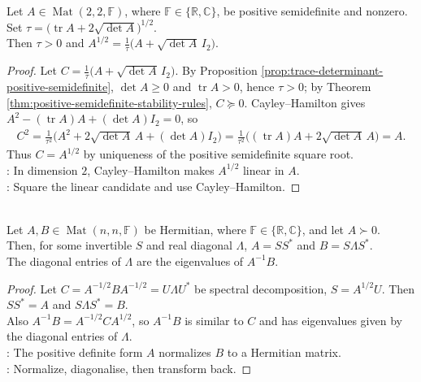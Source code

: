 \begin{proposition} \label{prop:two-by-two-positive-semidefinite-square-root} \\
Let $A\in\operatorname{Mat}(2,2,\mathbb{F})$, where $\mathbb{F}\in\{\mathbb{R},\mathbb{C}\}$, be positive semidefinite and nonzero. Set $\tau=\bigl(\operatorname{tr}A+2\sqrt{\det A}\bigr)^{1/2}$.\\
Then $\tau>0$ and $A^{1/2}=\frac{1}{\tau}\bigl(A+\sqrt{\det A}\,I_2\bigr)$.
\begin{proof}
Let $C=\frac{1}{\tau}\bigl(A+\sqrt{\det A}\,I_2\bigr)$. By Proposition \ref{prop:trace-determinant-positive-semidefinite}, $\det A\geq0$ and $\operatorname{tr}A>0$, hence $\tau>0$; by Theorem \ref{thm:positive-semidefinite-stability-rules}, $C\succeq0$. Cayley--Hamilton gives $A^2-(\operatorname{tr}A)A+(\det A)I_2=0$, so
\begin{align}
C^2 =\frac{1}{\tau^2}\bigl(A^2+2\sqrt{\det A}\,A+(\det A)I_2\bigr) =\frac{1}{\tau^2}\bigl((\operatorname{tr}A)A+2\sqrt{\det A}\,A\bigr)=A.
\nonumber
\end{align}
Thus $C=A^{1/2}$ by uniqueness of the positive semidefinite square root.\\
: In dimension $2$, Cayley--Hamilton makes $A^{1/2}$ linear in $A$.\\
: Square the linear candidate and use Cayley--Hamilton.
\end{proof}
\end{proposition}

\begin{theorem} \label{thm:simultaneous-congruence-one-positive-definite-form} \\
Let $A,B\in\operatorname{Mat}(n,n,\mathbb{F})$ be Hermitian, where $\mathbb{F}\in\{\mathbb{R},\mathbb{C}\}$, and let $A\succ0$.\\
Then, for some invertible $S$ and real diagonal $\Lambda$, $A=SS^*$ and $B=S\Lambda S^*$.\\
The diagonal entries of $\Lambda$ are the eigenvalues of $A^{-1}B$.
\begin{proof}
Let $C=A^{-1/2}BA^{-1/2}=U\Lambda U^*$ be spectral decomposition, $S=A^{1/2}U$. Then $SS^*=A$ and $S\Lambda S^*=B$.\\
Also $A^{-1}B=A^{-1/2}CA^{1/2}$, so $A^{-1}B$ is similar to $C$ and has eigenvalues given by the diagonal entries of $\Lambda$.\\
: The positive definite form $A$ normalizes $B$ to a Hermitian matrix.\\
: Normalize, diagonalise, then transform back.
\end{proof}
\end{theorem}

